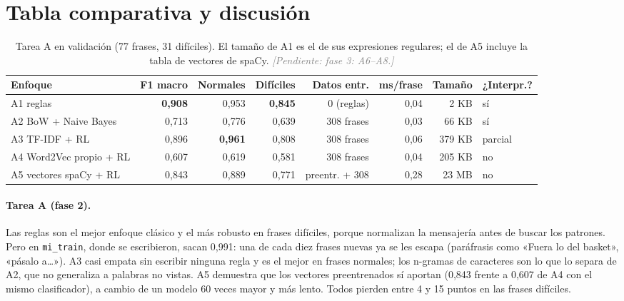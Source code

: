 \documentclass[10pt,a4paper]{article}
\newcommand{\cod}[1]{\texttt{#1}}
\newcommand{\pendiente}[1]{\textcolor{gray}{\textit{[Pendiente: #1]}}}
\begin{document}
\section{Tabla comparativa y discusión}\label{sec:tabla}

\begin{table}[h]
  \centering\small
  \begin{tabular}{@{}lrrrrrrl@{}}
    \toprule
    Enfoque & F1 macro & Normales & Difíciles & Datos entr. & ms/frase & Tamaño & ¿Interpr.? \\
    \midrule
    A1 reglas                    & \textbf{0,908} & 0,953 & \textbf{0,845} & 0 (reglas) & 0,04 & 2 KB & sí \\
    A2 BoW + Naive Bayes         & 0,713 & 0,776 & 0,639 & 308 frases & 0,03 & 66 KB & sí \\
    A3 TF-IDF + RL               & 0,896 & \textbf{0,961} & 0,808 & 308 frases & 0,06 & 379 KB & parcial \\
    A4 Word2Vec propio + RL      & 0,607 & 0,619 & 0,581 & 308 frases & 0,04 & 205 KB & no \\
    A5 vectores spaCy + RL       & 0,843 & 0,889 & 0,771 & preentr. + 308 & 0,28 & 23 MB & no \\
    \bottomrule
  \end{tabular}
  \caption{Tarea A en validación (77 frases, 31 difíciles). El tamaño de A1 es el de sus expresiones regulares; el de A5 incluye la tabla de vectores de spaCy. \pendiente{fase 3: A6--A8.}}
  \label{tab:A}
\end{table}

\paragraph{Tarea A (fase 2).} Las reglas son el mejor enfoque clásico y el más robusto en frases difíciles, porque normalizan la mensajería antes de buscar los patrones. Pero en \cod{mi\_train}, donde se escribieron, sacan 0,991: una de cada diez frases nuevas ya se les escapa (paráfrasis como «Fuera lo del basket», «pásalo a\dots»). A3 casi empata sin escribir ninguna regla y es el mejor en frases normales; los n-gramas de caracteres son lo que lo separa de A2, que no generaliza a palabras no vistas. A5 demuestra que los vectores preentrenados sí aportan (0,843 frente a 0,607 de A4 con el mismo clasificador), a cambio de un modelo 60 veces mayor y más lento. Todos pierden entre 4 y 15 puntos en las frases difíciles.
\end{document}
